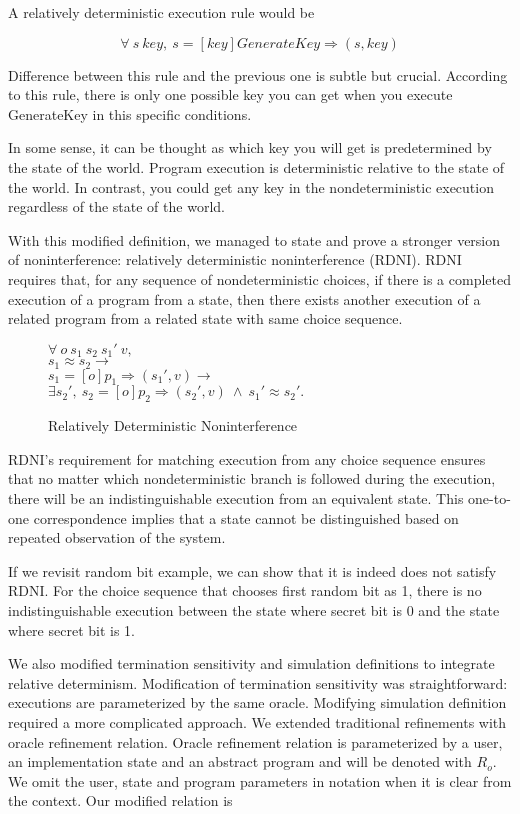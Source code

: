 A relatively deterministic execution rule would be

$$\forall\ s\ key,\ s  =[key]GenerateKey\Rightarrow (s, key)$$ 

Difference between this rule and the previous one is subtle but crucial. 
According to this rule, there is only one possible key you can get when you execute GenerateKey in this specific conditions.

In some sense, it can be thought as which key you will get is predetermined by the state of the world. Program execution is deterministic relative to the state of the world.
In contrast, you could get any key in the nondeterministic execution regardless of the state of the world.

With this modified definition, we managed to state and prove a stronger version of noninterference: relatively deterministic noninterference (RDNI). RDNI requires that, for any sequence of nondeterministic choices, if there is a completed execution of a program from a state, then there exists another execution of a related program from a related state with same choice sequence.

\begin{figure}[H]
	$\forall\ o\ s_1\ s_2\ s_1'\ v,$\\
	$s_1\approx s_2 \rightarrow$\\
	$s_1 =[o]p_1\Rightarrow (s_1', v) \rightarrow$\\
	$\exists s_2',\ s_2 =[o]p_2\Rightarrow (s_2', v)\ \wedge\ s_1'\approx s_2'.$\\
	\caption{Relatively Deterministic Noninterference}
\end{figure}

RDNI's requirement for matching execution from any choice sequence ensures that no matter which nondeterministic branch is followed during the execution, there will be an indistinguishable execution from an equivalent state. This one-to-one correspondence implies that a state cannot be distinguished based on repeated observation of the system.

If we revisit random bit example, we can show that it is indeed does not satisfy RDNI. For the choice sequence that chooses first random bit as 1, there is no indistinguishable execution between the state where secret bit is 0 and the state where secret bit is 1.

We also modified termination sensitivity and simulation definitions to integrate relative determinism. Modification of termination sensitivity was straightforward: executions are parameterized by the same oracle. Modifying simulation definition required a more complicated approach. We extended traditional refinements with oracle refinement relation.
Oracle refinement relation is parameterized by a user, an implementation state and an abstract program and will be denoted with $R_o$. We omit the user, state and program parameters in notation when it is clear from the context. Our modified relation is


